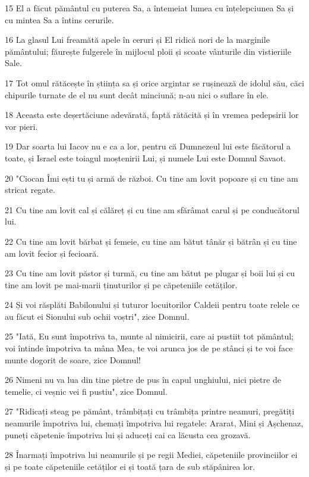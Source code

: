 \par 15 El a făcut pământul cu puterea Sa, a întemeiat lumea cu înțelepciunea Sa și cu mintea Sa a întins cerurile.
\par 16 La glasul Lui freamătă apele în ceruri și El ridică nori de la marginile pământului; făurește fulgerele în mijlocul ploii și scoate vânturile din vistieriile Sale.
\par 17 Tot omul rătăcește în știința sa și orice argintar se rușinează de idolul său, căci chipurile turnate de el nu sunt decât minciună; n-au nici o suflare în ele.
\par 18 Aceasta este deșertăciune adevărată, faptă rătăcită și în vremea pedepsirii lor vor pieri.
\par 19 Dar soarta lui Iacov nu e ca a lor, pentru că Dumnezeul lui este făcătorul a toate, și Israel este toiagul moștenirii Lui, și numele Lui este Domnul Savaot.
\par 20 "Ciocan Îmi ești tu și armă de război. Cu tine am lovit popoare și cu tine am stricat regate.
\par 21 Cu tine am lovit cal și călăreț și cu tine am sfărâmat carul și pe conducătorul lui.
\par 22 Cu tine am lovit bărbat și femeie, cu tine am bătut tânăr și bătrân și cu tine am lovit fecior și fecioară.
\par 23 Cu tine am lovit păstor și turmă, cu tine am bătut pe plugar și boii lui și cu tine am lovit pe mai-marii ținuturilor și pe căpeteniile cetăților.
\par 24 Și voi răsplăti Babilonului și tuturor locuitorilor Caldeii pentru toate relele ce au făcut ei Sionului sub ochii voștri", zice Domnul.
\par 25 "Iată, Eu sunt împotriva ta, munte al nimicirii, care ai pustiit tot pământul; voi întinde împotriva ta mâna Mea, te voi arunca jos de pe stânci și te voi face munte dogorit de soare, zice Domnul!
\par 26 Nimeni nu va lua din tine pietre de pus în capul unghiului, nici pietre de temelie, ci veșnic vei fi pustiu", zice Domnul.
\par 27 "Ridicați steag pe pământ, trâmbițați cu trâmbița printre neamuri, pregătiți neamurile împotriva lui, chemați împotriva lui regatele: Ararat, Mini și Așchenaz, puneți căpetenie împotriva lui și aduceți cai ca lăcusta cea grozavă.
\par 28 Înarmați împotriva lui neamurile și pe regii Mediei, căpeteniile provinciilor ei și pe toate căpeteniile cetăților ei și toată țara de sub stăpânirea lor.
